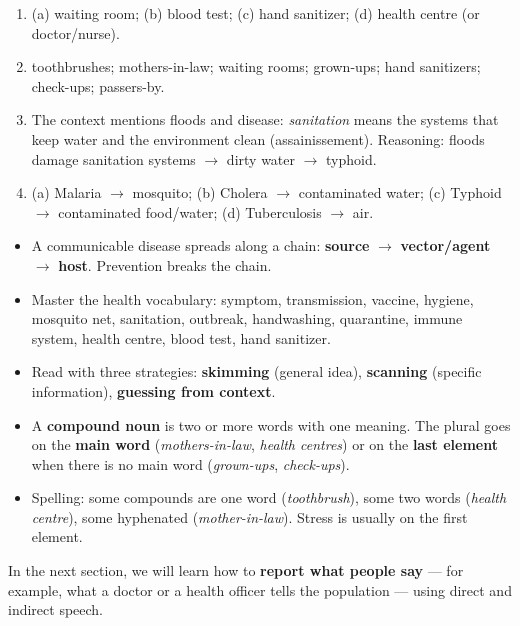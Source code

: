 \documentclass[11pt]{article}
\begin{document}
\begin{corrige}
\begin{enumerate}
\item (a) waiting room; (b) blood test; (c) hand sanitizer; (d) health centre (or doctor/nurse).
\item toothbrushes; mothers-in-law; waiting rooms; grown-ups; hand sanitizers; check-ups; passers-by.
\item The context mentions floods and disease: \emph{sanitation} means the systems that keep water and the environment clean (assainissement). Reasoning: floods damage sanitation systems $\rightarrow$ dirty water $\rightarrow$ typhoid.
\item (a) Malaria $\rightarrow$ mosquito; (b) Cholera $\rightarrow$ contaminated water; (c) Typhoid $\rightarrow$ contaminated food/water; (d) Tuberculosis $\rightarrow$ air.
\end{enumerate}
\end{corrige}

\begin{aretenir}
\begin{itemize}
\item A communicable disease spreads along a chain: \textbf{source} $\rightarrow$ \textbf{vector/agent} $\rightarrow$ \textbf{host}. Prevention breaks the chain.
\item Master the health vocabulary: symptom, transmission, vaccine, hygiene, mosquito net, sanitation, outbreak, handwashing, quarantine, immune system, health centre, blood test, hand sanitizer.
\item Read with three strategies: \textbf{skimming} (general idea), \textbf{scanning} (specific information), \textbf{guessing from context}.
\item A \textbf{compound noun} is two or more words with one meaning. The plural goes on the \textbf{main word} (\emph{mothers-in-law}, \emph{health centres}) or on the \textbf{last element} when there is no main word (\emph{grown-ups}, \emph{check-ups}).
\item Spelling: some compounds are one word (\emph{toothbrush}), some two words (\emph{health centre}), some hyphenated (\emph{mother-in-law}). Stress is usually on the first element.
\end{itemize}
\end{aretenir}

In the next section, we will learn how to \textbf{report what people say} --- for example, what a doctor or a health officer tells the population --- using direct and indirect speech.
\end{document}
